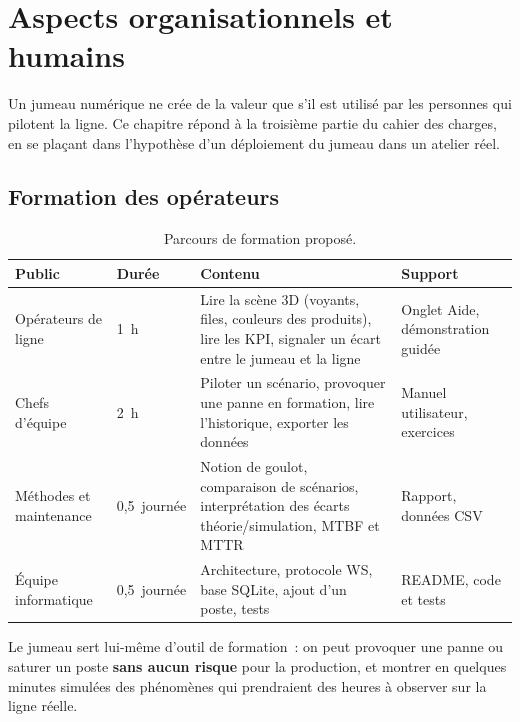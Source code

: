 \chapter{Aspects organisationnels et humains}
\label{chap:organisation}

Un jumeau numérique ne crée de la valeur que s'il est utilisé par les personnes qui pilotent la ligne. Ce chapitre répond à la troisième partie du cahier des charges, en se plaçant dans l'hypothèse d'un déploiement du jumeau dans un atelier réel.

\section{Formation des opérateurs}

\begin{table}[H]
\centering
\caption{Parcours de formation proposé.}
\label{tab:formation}
\begin{tabularx}{\textwidth}{@{}p{2.6cm} p{1.5cm} X p{3.2cm}@{}}
\toprule
\textbf{Public} & \textbf{Durée} & \textbf{Contenu} & \textbf{Support} \\
\midrule
Opérateurs de ligne & 1~h & Lire la scène 3D (voyants, files, couleurs des produits), lire les \ac{KPI}, signaler un écart entre le jumeau et la ligne & Onglet Aide, démonstration guidée \\
Chefs d'équipe & 2~h & Piloter un scénario, provoquer une panne en formation, lire l'historique, exporter les données & Manuel utilisateur, exercices \\
Méthodes et maintenance & 0,5~journée & Notion de goulot, comparaison de scénarios, interprétation des écarts théorie/simulation, \ac{MTBF} et \ac{MTTR} & Rapport, données \ac{CSV} \\
Équipe informatique & 0,5~journée & Architecture, protocole \ac{WS}, base SQLite, ajout d'un poste, tests & README, code et tests \\
\bottomrule
\end{tabularx}
\end{table}

Le jumeau sert lui-même d'outil de formation~: on peut provoquer une panne ou saturer un poste \textbf{sans aucun risque} pour la production, et montrer en quelques minutes simulées des phénomènes qui prendraient des heures à observer sur la ligne réelle.

